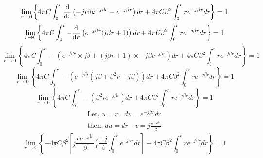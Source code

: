 \begin{dmath*}
\lim\limits_{r\rightarrow0} \left\lbrace4\pi C\int_{0}^{r}\derivative{}{r}\left(-jr\beta e^{-j\beta r} - e^{-j\beta r}\right)dr + 4\pi C\beta^{2}\int_{0}^{r}re^{-j\beta r}dr\right\rbrace = 1
\end{dmath*}
\begin{dmath*}
\lim\limits_{r\rightarrow0} \left\lbrace4\pi C\int_{0}^{r}-\derivative{}{r}\left( e^{-j\beta r} (j\beta r + 1)\right)dr + 4\pi C\beta^{2}\int_{0}^{r}re^{-j\beta r}dr\right\rbrace = 1
\end{dmath*}
\begin{dmath*}
\lim\limits_{r\rightarrow0} \left\lbrace4\pi C\int_{0}^{r}-(e^{-j\beta r}\times j\beta + (j\beta r + 1)\times -j\beta e^{-j\beta r})dr + 4\pi C\beta^{2}\int_{0}^{r}re^{-j\beta r}dr\right\rbrace = 1
\end{dmath*}
\begin{dmath*}
\lim\limits_{r\rightarrow0} \left\lbrace4\pi C\int_{0}^{r}-(e^{-j\beta r} (j\beta + \beta^2r - j\beta))dr + 4\pi C\beta^{2}\int_{0}^{r}re^{-j\beta r}dr\right\rbrace = 1
\end{dmath*}
\begin{dmath*}
\lim\limits_{r\rightarrow0} \left\lbrace4\pi C\int_{0}^{r}-(\beta^2r e^{-j\beta r})dr + 4\pi C\beta^{2}\int_{0}^{r}re^{-j\beta r}dr\right\rbrace = 1
\end{dmath*}
\begin{align*}
\text{Let, }u = r\quad dv=e^{-j\beta r}dr\\
\text{then, }du=dr\quad v=j\frac{e^{-j\beta r}}{\beta}
\end{align*}
\begin{dmath*}
\lim\limits_{r\rightarrow0} \left\lbrace-4\pi C\beta^{2}\left[j\frac{re^{-j\beta r}}{\beta}\bigg\vert_{0}^{r}\frac{-j}{\beta}\int_{0}^{r}e^{-j\beta r}dr\right] + 4\pi C\beta^{2}\int_{0}^{r}re^{-j\beta r}dr\right\rbrace = 1
\end{dmath*}
